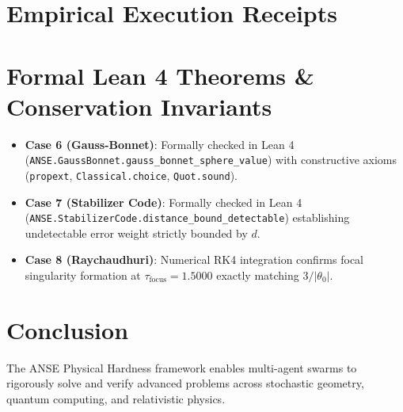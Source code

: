 \documentclass[10pt,journal,compsoc]{IEEEtran}
\begin{document}
\section{Empirical Execution Receipts}

\begin{table}[h]
\centering
\caption{Empirical Multi-Agent Execution Receipts (Cases 4 to 8)}
\label{tab:receipts4to8}
\end{table}

\section{Formal Lean 4 Theorems & Conservation Invariants}
\begin{itemize}
\item \textbf{Case 6 (Gauss-Bonnet)}: Formally checked in Lean 4 (\texttt{ANSE.GaussBonnet.gauss_bonnet_sphere_value}) with constructive axioms (\texttt{propext}, \texttt{Classical.choice}, \texttt{Quot.sound}).
\item \textbf{Case 7 (Stabilizer Code)}: Formally checked in Lean 4 (\texttt{ANSE.StabilizerCode.distance_bound_detectable}) establishing undetectable error weight strictly bounded by $d$.
\item \textbf{Case 8 (Raychaudhuri)}: Numerical RK4 integration confirms focal singularity formation at $\tau_{\text{focus}} = 1.5000$ exactly matching $3/|\theta_0|$.
\end{itemize}

\section{Conclusion}
The ANSE Physical Hardness framework enables multi-agent swarms to rigorously solve and verify advanced problems across stochastic geometry, quantum computing, and relativistic physics.
\end{document}
